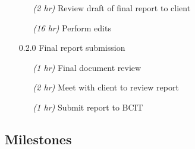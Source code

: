 \documentclass[11pt]{article}
\begin{document}
\begin{itemize}
\begin{itemize}
            \item[\emph{(2 hr)}] Review draft of final report to client
            \item[\emph{(16 hr)}] Perform edits
          \end{itemize}
        \item[0.2.0] Final report submission
          \begin{itemize}
            \item[\emph{(1 hr)}] Final document review
            \item[\emph{(2 hr)}] Meet with client to review report
            \item[\emph{(1 hr)}] Submit report to BCIT
          \end{itemize}
      \end{itemize}

    \subsection{Milestones}\label{sec:plan-milestones}
\end{document}

